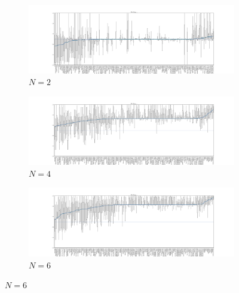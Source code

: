 \documentclass{article}
\begin{document}
\begin{figure}[!hbtp]
    \centering
    \begin{subfigure}[t]{\textwidth}
        \centering
        \includegraphics[width=\textwidth]{../img/boxplot_2_resist.pdf}
        \caption{\(N=2\)}
    \end{subfigure}%

    \begin{subfigure}[t]{\textwidth}
        \centering
        \includegraphics[width=\textwidth]{../img/boxplot_4_resist.pdf}
        \caption{\(N=4\)}
    \end{subfigure}%

    \begin{subfigure}[t]{\textwidth}
        \centering
        \includegraphics[width=\textwidth]{../img/boxplot_6_resist.pdf}
        \caption{\(N=6\)}
    \end{subfigure}%



\end{figure}
\end{document}
